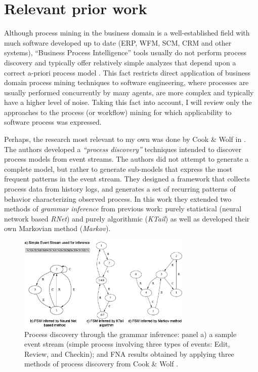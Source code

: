 \documentclass{sig-alternate}
\begin{document}
\section{Relevant prior work}
Although process mining in the business domain is a well-established field with much software developed up to date (ERP, WFM, SCM, CRM and other systems), ``Business Process Intelligence'' tools usually do not perform process discovery and typically offer relatively simple analyzes that depend upon a correct a-priori process model \cite{citeulike:5044991} \cite{citeulike:3718014} \cite{citeulike:2678511}. This fact restricts direct application of business domain process mining techniques to software engineering, where processes are usually performed concurrently by many agents, are more complex and typically have a higher level of noise. Taking this fact into account, I will review only the approaches to the process (or workflow) mining for which applicability to software process was expressed. 

Perhaps, the research most relevant to my own was done by Cook \& Wolf in \cite{citeulike:328044}. The authors developed a \textit{``process discovery''} techniques intended to discover process models from event streams. The authors did not attempt to generate a complete model, but rather to generate sub-models that express the most frequent patterns in the event stream. They designed a framework that collects process data from history logs, and generates a set of recurring patterns of behavior characterizing observed process. In this work they extended two methods of \textit{grammar inference} from previous work: purely statistical (neural network based \textit{RNet}) and purely algorithmic (\textit{KTail}) as well as developed their own Markovian method (\textit{Markov}). 

\begin{figure}[tbp]
   \centering
   \includegraphics[height=45mm]{inference.eps}
   \caption{Process discovery through the grammar inference: panel a) a sample event stream (simple process involving three types of events: Edit, Review, and Checkin); and FNA results obtained by applying three methods of process discovery from Cook \& Wolf \cite{citeulike:328044}.}
   \label{fig:inference}
\end{figure}
\end{document}

